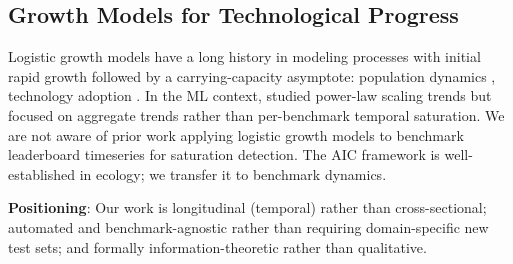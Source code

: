 \subsection{Growth Models for Technological Progress}

Logistic growth models have a long history in modeling processes with initial rapid growth followed by a carrying-capacity asymptote: population dynamics \citep{verhulst1838notice}, technology adoption \citep{bass1969new_product}.
In the ML context, \citet{kaplan2020scaling} studied power-law scaling trends but focused on aggregate trends rather than per-benchmark temporal saturation.
We are not aware of prior work applying logistic growth models to benchmark leaderboard timeseries for saturation detection.
The AIC framework \citep{burnham2002model} is well-established in ecology; we transfer it to benchmark dynamics.

\textbf{Positioning}: Our work is longitudinal (temporal) rather than cross-sectional; automated and benchmark-agnostic rather than requiring domain-specific new test sets; and formally information-theoretic rather than qualitative.
